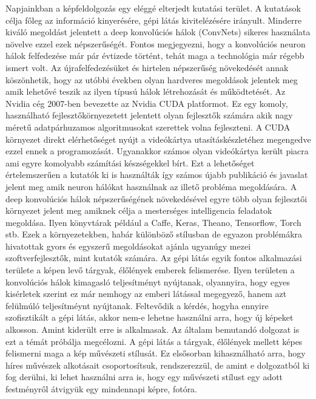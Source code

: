\documentclass[12pt, a4paper, oneside]{book}
\theoremstyle{tetel}
\begin{document}
Napjainkban a képfeldolgozás egy eléggé elterjedt kutatási terület. A kutatások célja főleg az információ kinyerésére, gépi látás kivitelézésére irányult. Minderre kiváló megoldást jelentett a deep konvolúciós hálok (ConvNets)\cite{1}\cite{2} sikeres használata növelve ezzel ezek népszerűségét. Fontos megjegyezni, hogy a konvolúciós neuron hálok felfedezése már pár évtizede történt, tehát maga a technológia már régebb ismert volt. Az újrafelfedezésüket és hirtelen népszerűség növekedését annak köszönhetik, hogy az utóbbi években olyan hardveres megoldások jelentek meg amik lehetővé teszik az ilyen típusú hálok létrehozását és működtetését. 
\newline 
\indent
Az Nvidia cég 2007-ben bevezette az Nvidia CUDA platformot\cite{3}. Ez egy komoly, használható fejlesztőkörnyezetett jelentett olyan fejlesztők számára akik nagy méretű adatpárhuzamos algoritmusokat szerettek volna fejleszteni. A CUDA környezet direkt elérhetőséget nyújt a videókártya utasításkészletéhez megengedve ezzel ennek a programozását. Ugyanakkor számos olyan videókártya került piacra ami egyre komolyabb számítási készségekkel bírt. Ezt a lehetőséget értelemszerűen a kutatók ki is használták így számos újabb publikáció és javaslat jelent meg amik neuron hálókat használnak az illető probléma megoldására.
\newline
\indent
A deep konvolúciós hálok népszerűségének növekedésével egyre több olyan fejlesztői környezet jelent meg amiknek célja a mesterséges intelligencia feladatok megoldása. Ilyen könyvtárak például a Caffe\cite{4}, Keras\cite{5}, Theano\cite{6}, Tensorflow\cite{7}, Torch\cite{8} stb. Ezek a környezetekben, habár különböző stílusban de egyazon problémákra hivatottak gyors és egyszerű megoldásokat ajánla ugyanúgy mezei szoftverfejlesztők, mint kutatók számára.
\newline
\indent
Az gépi látás egyik fontos alkalmazási területe a képen levő tárgyak, élőlények emberek felismerése. Ilyen területen a konvolúciós hálok kimagasló teljesítményt nyújtanak, olyannyira, hogy egyes kisérletek szerint ez már nemhogy az emberi látással megegyező, hanem azt felülmúló teljesítméynt nyújtanak\cite{9}. Feltevődik a kérdés, hogyha ennyire szofisztikált a gépi látás, akkor nem-e lehetne használni arra, hogy új képeket alkosson. Amint kiderült erre is alkalmasak. Az általam bemutandó dolgozat is ezt a témát próbálja megcélozni. A gépi látás a tárgyak, élőlények mellett képes felismerni maga a kép művészeti stílusát. Ez elsősorban kihasználható arra, hogy híres művészek alkotásait csoportosítsuk, rendszerezzül\cite{10}, de amint e dolgozatból ki fog derülni, ki lehet használni arra is, hogy egy művészeti stílust egy adott festményről átvigyük egy mindennapi képre, fotóra. 
\end{document}
